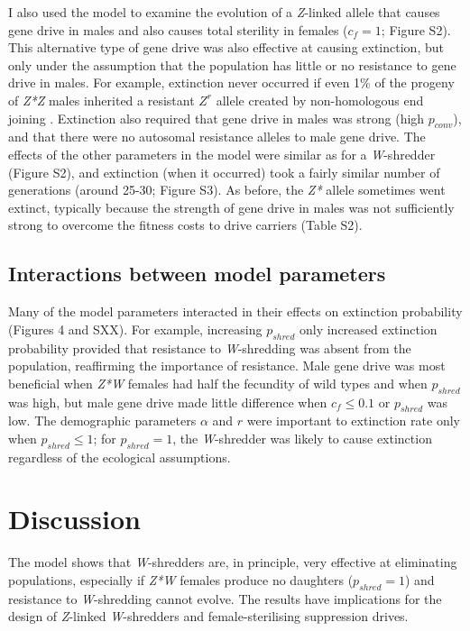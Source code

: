 \documentclass[]{rsos}%
\begin{document}
I also used the model to examine the evolution of a \emph{Z}-linked
allele that causes gene drive in males and also causes total sterility
in females (\(c_f = 1\); Figure S2). This alternative type of gene drive
was also effective at causing extinction, but only under the assumption
that the population has little or no resistance to gene drive in males.
For example, extinction never occurred if even 1\% of the progeny of
\emph{Z*Z} males inherited a resistant \(Z^r\) allele created by
non-homologous end joining \citep[c.f.][]{unckless2017ev}. Extinction
also required that gene drive in males was strong (high \(p_{conv}\)),
and that there were no autosomal resistance alleles to male gene drive.
The effects of the other parameters in the model were similar as for a
\emph{W}-shredder (Figure S2), and extinction (when it occurred) took a
fairly similar number of generations (around 25-30; Figure S3). As
before, the \emph{Z*} allele sometimes went extinct, typically because
the strength of gene drive in males was not sufficiently strong to
overcome the fitness costs to drive carriers (Table S2).

\hypertarget{interactions-between-model-parameters}{%
\subsection{Interactions between model
parameters}\label{interactions-between-model-parameters}}

Many of the model parameters interacted in their effects on extinction
probability (Figures 4 and SXX). For example, increasing \(p_{shred}\)
only increased extinction probability provided that resistance to
\emph{W}-shredding was absent from the population, reaffirming the
importance of resistance. Male gene drive was most beneficial when
\emph{Z*W} females had half the fecundity of wild types and when
\(p_{shred}\) was high, but male gene drive made little difference when
\(c_f \le 0.1\) or \(p_{shred}\) was low. The demographic parameters
\(\alpha\) and \(r\) were important to extinction rate only when
\(p_{shred} \le 1\); for \(p_{shred} = 1\), the \emph{W}-shredder was
likely to cause extinction regardless of the ecological assumptions.

\hypertarget{discussion}{%
\section{Discussion}\label{discussion}}

The model shows that \emph{W}-shredders are, in principle, very
effective at eliminating populations, especially if \emph{Z*W} females
produce no daughters (\(p_{shred} = 1\)) and resistance to
\emph{W}-shredding cannot evolve. The results have implications for the
design of \emph{Z}-linked \emph{W}-shredders and female-sterilising
suppression drives.
\end{document}
